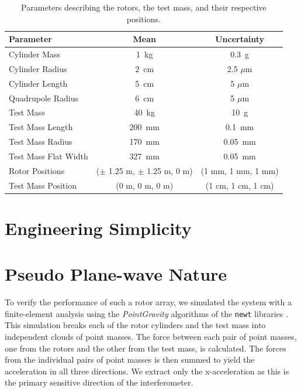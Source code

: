 \documentclass[superscriptaddress, twocolumn, prd]{revtex4-1}
\begin{document}
\begin{widetext}
\begingroup
\setlength{\tabcolsep}{10pt} %
\renewcommand{\arraystretch}{1.5} %

\begin{table}[h!]
\begin{center}
\begin{tabular}{ |l|c|c| }
\hline
 Parameter & Mean & Uncertainty \\
 \hline
Cylinder Mass & 1~kg & 0.3~g \\
Cylinder Radius & 2~cm & 2.5 $\mu$m \\
Cylinder Length & 5~cm & 5 $\mu$m \\
Quadrupole Radius & 6~cm & 5 $\mu$m \\
Test Mass & 40~kg & 10~g \\
Test Mass Length & 200~mm & 0.1~mm\\
Test Mass Radius & 170~mm & 0.05~mm\\
Test Mass Flat Width & 327~mm & 0.05~mm\\
Rotor Positions & ($\pm$ 1.25 m, $\pm$ 1.25 m, 0 m) & (1 mm, 1 mm, 1 mm) \\
Test Mass Position & (0 m, 0 m, 0 m) & (1 cm, 1 cm, 1 cm) \\
 \hline

 \end{tabular}
 \caption{Parameters describing the rotors, the test mass, and their respective positions.}\label{param}
 \end{center}

\end{table}
\endgroup
\end{widetext}

\section{Engineering Simplicity}



\section{Pseudo Plane-wave Nature}

To verify the performance of such a rotor array, we simulated the system with a finite-element analysis using the \textit{PointGravity} algorithms of the \texttt{newt} libraries \cite{Hagedorn, pgURL}. This simulation breaks each of the rotor cylinders and the test mass into independent clouds of point masses. The force between each pair of point masses, one from the rotors and the other from the test mass, is calculated. The forces from the individual pairs of point masses is then summed to yield the acceleration in all three directions. We extract only the x-acceleration as this is the primary sensitive direction of the interferometer.
\end{document}
